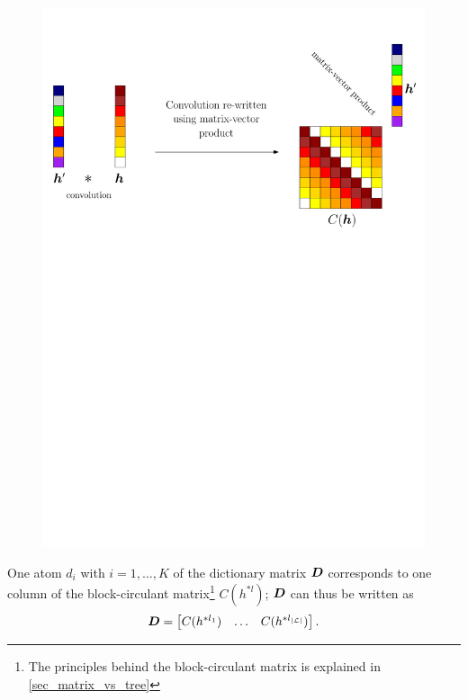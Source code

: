 \begin{figure}[!ht] \centering
\includegraphics[width=\textwidth]{figures/block-circulant_matrix.pdf}
\caption{} \label{fig_block_circular}
\end{figure}

One atom $d_i$ with $i = 1,\dots,K$ of the dictionary matrix $\bm{D}$ corresponds to one column of the block-circulant matrix\footnote{The principles behind the block-circulant matrix is explained in \cref{sec_matrix_vs_tree}} $C(h^{*l})$; $\bm{D}$ can thus be written as
$$\bm{D} = \begin{bmatrix} C(h^{*l_1}) & \dots & C(h^{*l_{|\mathcal L|}}) \end{bmatrix}.$$



